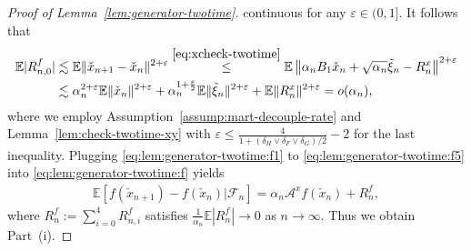 \documentclass[11pt]{article}
\theoremstyle{plain}
\theoremstyle{definition}
\newcommand{\inner}[2]{\langle #1, #2 \rangle}
\def\Hsmooth{{\delta_H}}
\def\Fsmooth{{\delta_F}}
\def\Gsmooth{{\delta_G}}
\def\eps{{\varepsilon}}
\def\AM{{\mathcal A}}
\def\FM{{\mathcal F}}
\def\EB{{\mathbb E}}
\def\tr{\mathrm{tr}}
\newcommand{\xcheck}{{\check{x}}}
\newcommand{\ssum}[3]{\sum\limits_{{#1}={#2}}^{#3}}
\begin{document}
\begin{appendix}
\begin{proof}[Proof of Lemma~\ref{lem:generator-twotime}]
    continuous for any $\eps \in (0,1]$.
    It follows that
    \begin{align}
        \EB | R^f_{n,0} |
        & \lesssim \EB \| \xcheck_{n+1} - \xcheck_{n} \|^{2+\eps}
        \overset{\eqref{eq:xcheck-twotime}}{\le} \EB \left\| \alpha_{n} B_1 \xcheck_{n} + \sqrt{\alpha_{n}} \tilde{\xi}_{n} - R^x_{n} \right\|^{2+\eps} \nonumber \\
        & \lesssim \alpha_{n}^{2+\eps} \EB \| \xcheck_{n} \|^{2+\eps} + \alpha_{n}^{1+\frac{\eps}{2}} \EB \| \tilde{\xi}_{n} \|^{2+\eps} + \EB \| R^x_{n} \|^{2+\eps} = o(\alpha_{n}), \label{eq:lem:generator-twotime:f5}
    \end{align}
    where we employ Assumption~\ref{assump:mart-decouple-rate} and Lemma~\ref{lem:check-twotime-xy} with $\eps \le \frac{4}{1 + (\Hsmooth \vee \Fsmooth \vee \Gsmooth) / 2} - 2$ for the last inequality.
    Plugging \eqref{eq:lem:generator-twotime:f1} to \eqref{eq:lem:generator-twotime:f5} into \eqref{eq:lem:generator-twotime:f} yields
    \begin{align*}
        \EB [ f (\xcheck_{n+1}) - f(\xcheck_{n}) | \FM_{n} ]
        = \alpha_{n} \AM^x f(\xcheck_{n})
        + R^f_{n},
    \end{align*}
    where
    $R^f_{n} := \ssum{i}{0}{4} R^f_{n,i}$ satisfies $\frac{1}{\alpha_{n}} \EB | R^f_{n} | \to 0$ as $n \to \infty$. Thus we obtain Part~(i).
    \vspace{0.2cm}
    

\end{proof}
\end{appendix}
\end{document}

